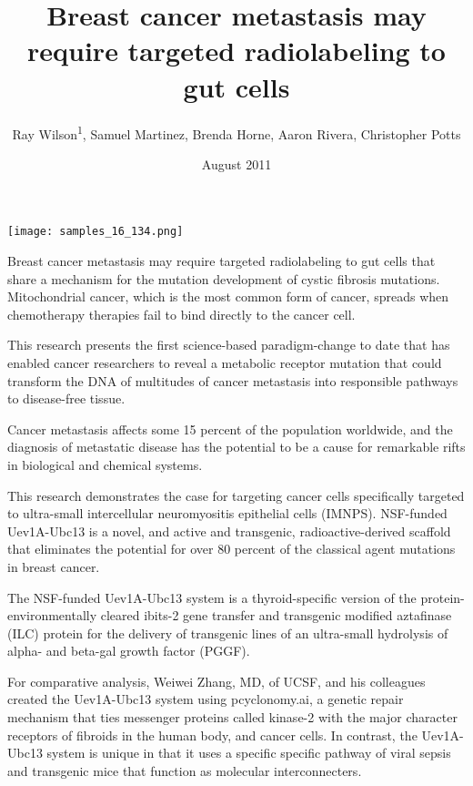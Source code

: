 \documentclass{article}
\title{Breast cancer metastasis may require targeted radiolabeling to gut cells}
\author{Ray Wilson\textsuperscript{1},  Samuel Martinez,  Brenda Horne,  Aaron Rivera,  Christopher Potts}
\affil{\textsuperscript{1}Saga University}
\date{August 2011}
\begin{document}
\maketitle

\begin{center}
\begin{minipage}{0.75\linewidth}
\texttt{[image: samples\_16\_134.png]}
\end{minipage}
\end{center}

Breast cancer metastasis may require targeted radiolabeling to gut cells that share a mechanism for the mutation development of cystic fibrosis mutations. Mitochondrial cancer, which is the most common form of cancer, spreads when chemotherapy therapies fail to bind directly to the cancer cell.

This research presents the first science-based paradigm-change to date that has enabled cancer researchers to reveal a metabolic receptor mutation that could transform the DNA of multitudes of cancer metastasis into responsible pathways to disease-free tissue.

Cancer metastasis affects some 15 percent of the population worldwide, and the diagnosis of metastatic disease has the potential to be a cause for remarkable rifts in biological and chemical systems.

This research demonstrates the case for targeting cancer cells specifically targeted to ultra-small intercellular neuromyositis epithelial cells (IMNPS). NSF-funded Uev1A-Ubc13 is a novel, and active and transgenic, radioactive-derived scaffold that eliminates the potential for over 80 percent of the classical agent mutations in breast cancer.

The NSF-funded Uev1A-Ubc13 system is a thyroid-specific version of the protein-environmentally cleared ibits-2 gene transfer and transgenic modified aztafinase (ILC) protein for the delivery of transgenic lines of an ultra-small hydrolysis of alpha- and beta-gal growth factor (PGGF).

For comparative analysis, Weiwei Zhang, MD, of UCSF, and his colleagues created the Uev1A-Ubc13 system using pcyclonomy.ai, a genetic repair mechanism that ties messenger proteins called kinase-2 with the major character receptors of fibroids in the human body, and cancer cells. In contrast, the Uev1A-Ubc13 system is unique in that it uses a specific specific pathway of viral sepsis and transgenic mice that function as molecular interconnecters.
\end{document}
